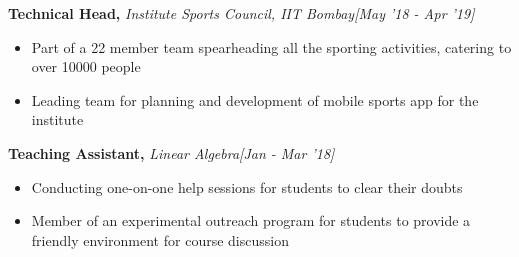 \documentclass{article}
\begin{document}
\hspace{-14pt}\textbf{Technical Head,} {\it Institute Sports Council, IIT Bombay}\hfill{\sl[May '18 - Apr '19]}\\
\vspace{-19pt}
\begin{itemize}[itemsep = -2pt, leftmargin=*]
	\item Part of a 22 member team spearheading all the sporting activities, catering to over 10000 people
	\item Leading team for planning and development of mobile sports app for the institute
\end{itemize}
\vspace{-2pt}

\hspace{-14pt}\textbf{Teaching Assistant,} {\it Linear Algebra}\hfill{\sl[Jan - Mar '18]}\\
\vspace{-19pt}
\begin{itemize}[itemsep = -2pt, leftmargin=*]
	\item Conducting one-on-one help sessions for students to clear their doubts
	\item Member of an experimental outreach program for students to provide a friendly environment for course discussion
\end{itemize}
\vspace{-2pt}


\end{document}
